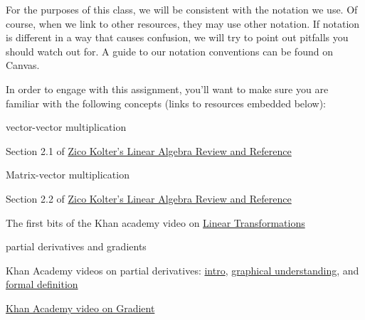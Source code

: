 \documentclass[assignment01_Solutions]{subfiles}
\begin{document}
\begin{notice}
For the purposes of this class, we will be consistent with the notation we use.  Of course, when we link to other resources, they may use other notation.  If notation is different in a way that causes confusion, we will try to point out pitfalls you should watch out for.  A guide to our notation conventions can be found on Canvas.
\end{notice}

\begin{recall}
In order to engage with this assignment, you'll want to make sure you are familiar with the following concepts (links to resources embedded below):
\bi
\item vector-vector multiplication
\bi
\item Section 2.1 of \href{https://see.stanford.edu/materials/aimlcs229/cs229-linalg.pdf}{Zico Kolter's Linear Algebra Review and Reference}
\ei
\item Matrix-vector multiplication
\bi
\item Section 2.2 of \href{https://see.stanford.edu/materials/aimlcs229/cs229-linalg.pdf}{Zico Kolter's Linear Algebra Review and Reference}
\item The first bits of the Khan academy video on \href{https://www.khanacademy.org/math/linear-algebra/matrix-transformations/linear-transformations/v/matrix-vector-products-as-linear-transformations}{Linear Transformations}
\ei
\item partial derivatives and gradients
\bi
\item Khan Academy videos on partial derivatives: \href{https://www.khanacademy.org/math/multivariable-calculus/multivariable-derivatives/partial-derivatives/v/partial-derivatives-introduction}{intro}, \href{https://www.khanacademy.org/math/multivariable-calculus/multivariable-derivatives/partial-derivatives/v/partial-derivatives-and-graphs}{graphical understanding}, and \href{https://www.khanacademy.org/math/multivariable-calculus/multivariable-derivatives/partial-derivatives/v/formal-definition-of-partial-derivatives}{formal definition}
\item \href{https://www.khanacademy.org/math/multivariable-calculus/multivariable-derivatives/gradient-and-directional-derivatives/v/gradient}{Khan Academy video on Gradient}
\ei
\ei
\end{recall}
\end{document}
